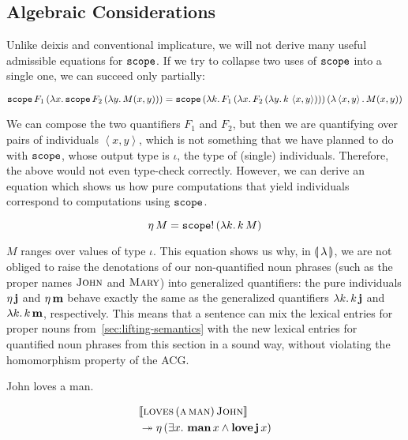 \subsection{Algebraic Considerations}
\label{ssec:algebraic-quantification}

Unlike deixis and conventional implicature, we will not derive many useful
admissible equations for $\mathtt{scope}$. If we try to collapse two uses of
$\mathtt{scope}$ into a single one, we can succeed only partially:

$$
\mathtt{scope}\,F_1\,(\lambda x.\, \mathtt{scope}\,F_2\,(\lambda y.\, M(x,y)))
= \mathtt{scope}\,(\lambda k.\, F_1\,(\lambda x.\, F_2\,(\lambda y.\, k\,\left<x,y\right>)))\,(\lambda \left<x,y\right>.\, M(x,y))
$$

We can compose the two quantifiers $F_1$ and $F_2$, but then we are
quantifying over pairs of individuals $\left<x,y\right>$, which is not
something that we have planned to do with $\mathtt{scope}$, whose output type
is $\iota$, the type of (single) individuals. Therefore, the above would
not even type-check correctly. However, we can derive an equation which
shows us how pure computations that yield individuals correspond to
computations using $\mathtt{scope}$.

$$
\eta\,M = \mathtt{scope}!\,(\lambda k.\, k\,M)
$$

$M$ ranges over values of type $\iota$. This equation shows us why, in
$\llparenthesis \, \lambda \, \rrparenthesis$, we are not obliged to raise the denotations of our
non-quantified noun phrases (such as the proper names $\textsc{John}$ and
$\textsc{Mary}$) into generalized quantifiers: the pure individuals
$\eta\,\textbf{j}$ and $\eta\,\textbf{m}$ behave exactly the same as the
generalized quantifiers $\lambda k.\, k\,\textbf{j}$ and
$\lambda k.\, k\,\textbf{m}$, respectively. This means that a sentence can
mix the lexical entries for proper nouns from~\ref{sec:lifting-semantics}
with the new lexical entries for quantified noun phrases from this section
in a sound way, without violating the homomorphism property of the ACG.

\begin{exe}
  \ex John loves a man. \label{ex:mixed-nps}
\end{exe}

\vspace{-8mm}

\NoChapterPrefix
\begin{align}
& \llbracket \textsc{loves}\,(\textsc{a}\,\textsc{man})\,\textsc{John} \rrbracket \nonumber \\
&\twoheadrightarrow \eta\,(\exists x.\ \textbf{man}\,x \land \textbf{love}\,\textbf{j}\,x)
\end{align}
\ChapterPrefix

